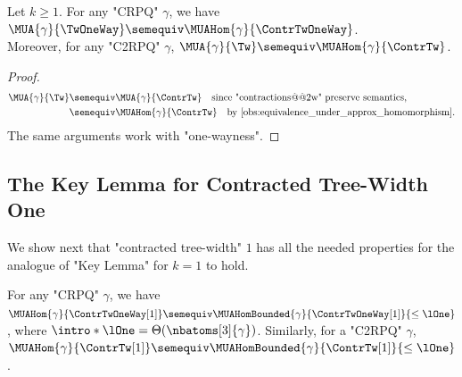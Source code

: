 \begin{fact}
	\AP\label{fact:tw-equiv-to-ctw}
	Let $k \geq 1$. For any "CRPQ" $\gamma$, we have
	$\MUA{\gamma}{\TwOneWay} \semequiv \MUAHom{\gamma}{\ContrTwOneWay}$.\\
	Moreover, for any "C2RPQ" $\gamma$,
	$\MUA{\gamma}{\Tw} \semequiv \MUAHom{\gamma}{\ContrTw}$.
\end{fact}
\begin{proof}
	\begin{align*}
		\MUA{\gamma}{\Tw}
			& \semequiv \MUA{\gamma}{\ContrTw}
			\quad\text{since "contractions@@2w" preserve semantics,} \\
			& \semequiv \MUAHom{\gamma}{\ContrTw}
			\quad\text{by \Cref{obs:equivalence_under_approx_homomorphism}.}
	\end{align*}
	The same arguments work with "one-wayness".
\end{proof}

\subsection{The Key Lemma for Contracted Tree-Width One}
We show next that "contracted tree-width" $1$ has all the needed properties for the analogue of "Key Lemma" for $k=1$ to hold.

\begin{lemma}
    \AP\label{lemma:bound_size_refinements_tw}
    \AP For any "CRPQ" $\gamma$, we have
    $\MUAHom{\gamma}{\ContrTwOneWay[1]} \semequiv \MUAHomBounded{\gamma}{\ContrTwOneWay[1]}{\leq\lOne}$, where
    $\intro*\lOne = \Theta(\nbatoms[3]{\gamma})$.
	Similarly, for a "C2RPQ" $\gamma$,
	$\MUAHom{\gamma}{\ContrTw[1]} \semequiv
		\MUAHomBounded{\gamma}{\ContrTw[1]}{\leq\lOne}$.
\end{lemma}

